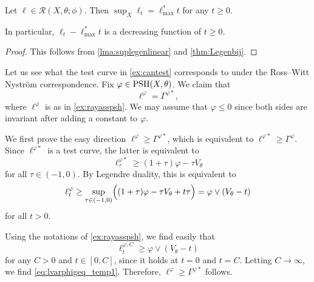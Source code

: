 \begin{corollary}\label{cor:reltestcursuplinear}
    Let $\ell\in \mathcal{R}(X,\theta;\phi)$. Then $\sup_X \ell_t=\ell^*_{\max}t$ for any $t\geq 0$.

    In particular, $\ell_t-\ell^*_{\max}t$ is a decreasing function of $t\geq 0$.
\end{corollary}
\begin{proof}
    This follows from \cref{lma:suplegenlinear} and \cref{thm:Legenbij}.
\end{proof}

\begin{example}\label{ex:testcurve:L843}
    Let us see what the test curve in \cref{ex:cantest} corresponds to under the Ross--Witt Nyström correspondence. Fix $\varphi\in \mathrm{PSH}(X,\theta)$.
    We claim that
    \begin{equation}\label{eq:RWNsingtype}
    \ell^{\varphi}=\Gamma^{\varphi*},
    \end{equation}
    where $\ell^{\varphi}$ is as in \cref{ex:rayasspsh}.
    We may assume that $\varphi\leq 0$ since both sides are invariant after adding a constant to $\varphi$.

    We first prove the easy direction $\ell^{\varphi}\geq \Gamma^{\varphi*}$, which is equivalent to $\ell^{\varphi *}\geq \Gamma^{\varphi}$. Since $\ell^{\varphi *}$ is a test curve, the latter is equivalent to
    \[
    \ell^{\varphi*}_{\tau}\geq (1+\tau)\varphi-\tau V_{\theta}
    \]
    for all $\tau\in (-1,0)$. By Legendre duality, this is equivalent to
    \begin{equation}\label{eq:lvarphigeq_temp1}
    \ell^{\varphi}_t\geq \sup_{\tau\in (-1,0)} \Bigl((1+\tau)\varphi-\tau V_{\theta}+t\tau\Bigr)=\varphi\lor (V_{\theta}-t)
    \end{equation}
    for all $t>0$.

    Using the notations of \cref{ex:rayasspsh}, we find easily that
    \[
    \ell^{\varphi,C}_t\geq \varphi\lor (V_{\theta}-t)
    \]
    for any $C>0$ and $t\in [0,C]$, since it holds at $t=0$ and $t=C$. Letting $C\to \infty$, we find \eqref{eq:lvarphigeq_temp1}.
    Therefore, $\ell^{\varphi}\geq \Gamma^{\varphi*}$ follows.


\end{example}

